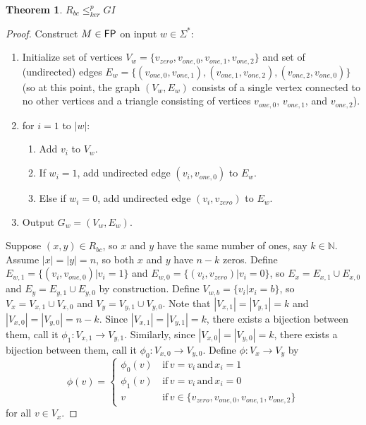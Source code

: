 \documentclass{article}
\newtheorem{theorem}{Theorem}[section]
\theoremstyle{definition}
\newcommand{\plain}[1]{\,\text{#1}\,}
\newcommand{\sigmastar}{\Sigma^{*}}
\newcommand{\kr}{\leq^{p}_{ker}}
\begin{document}
\begin{theorem}\label{thm:rbc-gi}$R_{bc}\kr GI$\end{theorem}
\begin{proof}
  Construct $M\in {\ensuremath{\mathsf{FP}}}$ on input $w \in \sigmastar$:
  \begin{enumerate}
  \item Initialize set of vertices $V_w=\{v_{zero}, v_{one,0}, v_{one,1},
    v_{one,2}\}$ and set of (undirected) edges $E_w=\{(v_{one,0}, v_{one,1}),
    (v_{one,1}, v_{one,2}), (v_{one,2}, v_{one,0})\}$ (so at this point, the
    graph $(V_w, E_w)$ consists of a single vertex connected to no other
    vertices and a triangle consisting of vertices $v_{one,0}$, $v_{one,1}$,
    and $v_{one,2}$).
  \item for $i=1$ to $|w|$:
    \begin{enumerate}
    \item Add $v_i$ to $V_w$.
    \item If $w_i = 1$, add undirected edge $(v_i, v_{one,0})$ to $E_w$.
    \item Else if $w_i = 0$, add undirected edge $(v_i, v_{zero})$ to $E_w$.
    \end{enumerate}
  \item Output $G_w=(V_w, E_w)$.
  \end{enumerate}
  
  Suppose $(x,y)\in R_{bc}$, so $x$ and $y$ have the same number of ones, say
  $k\in\mathbb{N}$. Assume $|x|=|y|=n$, so both $x$ and $y$ have $n-k$
  zeros. Define $E_{w,1}=\{(v_i, v_{one,0})|v_i = 1\}$ and $E_{w,0}=\{(v_i,
  v_{zero})|v_i = 0\}$, so $E_x = E_{x,1}\cup E_{x,0}$ and $E_y = E_{y,1} \cup
  E_{y,0}$ by construction. Define $V_{w,b}=\{v_i|x_i=b\}$, so $V_x=V_{x,1}
  \cup V_{x,0}$ and $V_y=V_{y,1} \cup V_{y,0}$. Note that
  $|V_{x,1}|=|V_{y,1}|=k$ and $|V_{x,0}|=|V_{y,0}|=n-k$. Since
  $|V_{x,1}|=|V_{y,1}|=k$, there exists a bijection between them, call it
  $\phi_1:V_{x,1}\to V_{y,1}$. Similarly, since $|V_{x,0}|=|V_{y,0}|=k$, there
  exists a bijection between them, call it $\phi_0:V_{x,0}\to V_{y,0}$. Define
  $\phi:V_x\to V_y$ by 
  \begin{displaymath}
    \phi(v) = 
    \begin{cases}
      \phi_0(v) & \plain{if} v = v_i \plain{and} x_i = 1\\
      \phi_1(v) & \plain{if} v = v_i \plain{and} x_i = 0\\
      v & \plain{if} v \in \{v_{zero}, v_{one,0}, v_{one,1}, v_{one,2}\}
    \end{cases}
  \end{displaymath}
  for all $v\in V_x$.


\end{proof}
\end{document}
